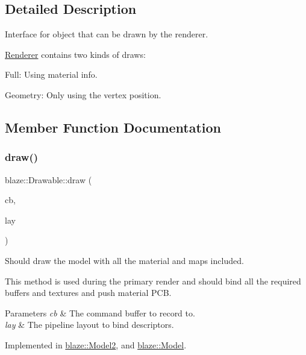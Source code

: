 \subsection{Detailed Description}
Interface for object that can be drawn by the renderer. 

\hyperlink{classblaze_1_1Renderer}{Renderer} contains two kinds of draws\+: \begin{DoxyItemize}
\item Full\+: Using material info. \item Geometry\+: Only using the vertex position. \end{DoxyItemize}


\subsection{Member Function Documentation}
\mbox{\label{classblaze_1_1Drawable_a810b411ced93f27781a40a170714b590}} 
\subsubsection{\texorpdfstring{draw()}{draw()}}
{\footnotesize\ttfamily blaze\+::\+Drawable\+::draw (\begin{DoxyParamCaption}\item[{Vk\+Command\+Buffer}]{cb,  }\item[{Vk\+Pipeline\+Layout}]{lay }\end{DoxyParamCaption})\hspace{0.3cm}{\ttfamily [pure virtual]}}



Should draw the model with all the material and maps included. 

This method is used during the primary render and should bind all the required buffers and textures and push material P\+CB.


\begin{DoxyParams}{Parameters}
{\em cb} & The command buffer to record to. \\
\hline
{\em lay} & The pipeline layout to bind descriptors. \\
\hline
\end{DoxyParams}


Implemented in \hyperlink{classblaze_1_1Model2_a82bab7e2bed8bbbbff8f9c250785281d}{blaze\+::\+Model2}, and \hyperlink{classblaze_1_1Model_a00c3a74721bcad2d066de0c78313dae5}{blaze\+::\+Model}.

